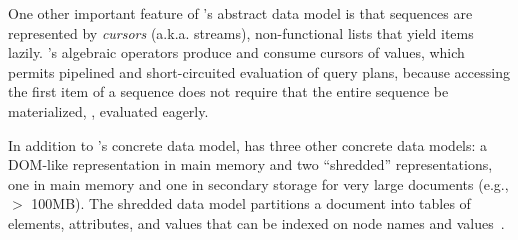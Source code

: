 One other important feature of \Galax{}'s abstract data model is that
sequences are represented by \emph{cursors} (a.k.a. streams),
non-functional lists that yield items lazily.  \Galax{}'s algebraic
operators produce and consume cursors of values, which permits
pipelined and short-circuited evaluation of query plans, because
accessing the first item of a sequence does not require that the
entire sequence be materialized, \ie{}, evaluated eagerly.

In addition to \padx{}'s concrete data model, \Galax{} has three other
concrete data models: a DOM-like representation in main memory and two
``shredded'' representations, one in main memory and one in secondary
storage for very large documents (e.g., $>$ 100MB).  The shredded data
model partitions a document into tables of elements, attributes, and
values that can be indexed on node names and
values~\cite{galax:ximep2004}.


